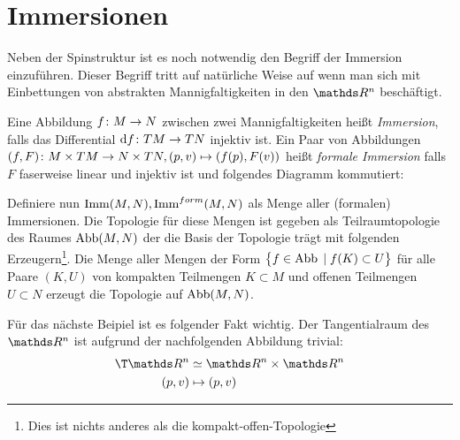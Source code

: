 



\section{Immersionen}
\label{sec:Immersionen}
Neben der Spinstruktur ist es noch notwendig den Begriff der Immersion 
einzuführen. Dieser Begriff tritt auf natürliche Weise auf wenn man sich
mit Einbettungen von abstrakten Mannigfaltigkeiten in den $ \R^n $ beschäftigt.

\begin{Def}
	\label{formIso}
	Eine Abbildung $f \colon M \rightarrow N$ zwischen zwei Mannigfaltigkeiten
	heißt \textit{Immersion}, falls das Differential $\mathrm{d} f \colon TM \rightarrow TN$ 
	injektiv ist.
	Ein Paar von Abbildungen $\abb{(f,F)}{M \times TM}{N \times TN} ,%
	(p,v) \mapsto (f(p),F(v))$ heißt \textit{formale Immersion} falls $ F $ faserweise linear und injektiv ist und folgendes
	Diagramm kommutiert:
	\begin{center}
		
		
	\end{center}
	
	Definiere nun $\operatorname{Imm}(M,N),\operatorname{Imm}^{form}(M,N)$ als Menge aller (formalen) Immersionen. Die Topologie für diese Mengen ist gegeben als Teilraumtopologie des Raumes $\operatorname{Abb}(M,N)$ der die Basis der Topologie 
	trägt mit folgenden Erzeugern\footnote{Dies ist nichts anderes als die kompakt-offen-Topologie}. Die Menge aller Mengen der Form $\bigl\{ f \in \operatorname{Abb} \; | \;  f(K) \subset U \bigr\}$
	für alle Paare $(K,U)$ von kompakten Teilmengen $K \subset M$ und
	offenen Teilmengen $U \subset N$ erzeugt die Topologie auf $\operatorname{Abb}(M,N)$.
\end{Def}


Für das nächste Beipiel ist es folgender Fakt wichtig. Der Tangentialraum des $\R^n$ ist aufgrund der nachfolgenden Abbildung trivial:
\begin{align*}
\T \R^n &\simeq \R^n \times \R^n \\
(p,v) &\mapsto (p,v)
\end{align*}

